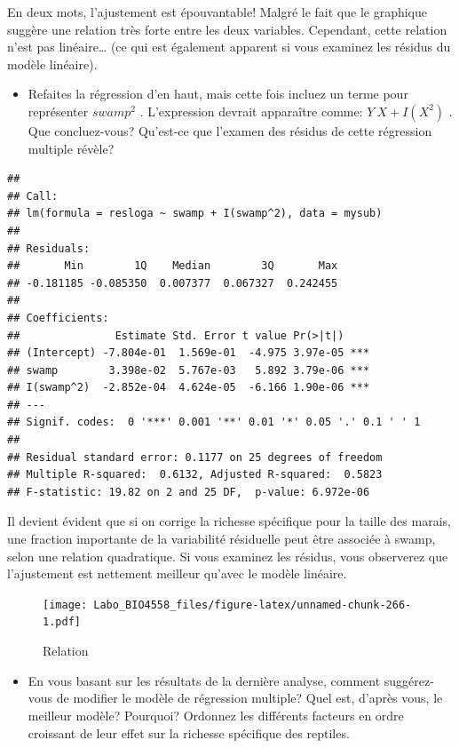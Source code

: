 \documentclass[
  12pt,
]{book}
\providecommand{\tightlist}{%
  \setlength{\itemsep}{0pt}\setlength{\parskip}{0pt}}
\begin{document}
En deux mots, l'ajustement est épouvantable! Malgré le fait que le graphique suggère une relation très forte entre les deux variables. Cependant, cette relation n'est pas linéaire\ldots{} (ce qui est également apparent si vous examinez les résidus du modèle linéaire).

\begin{itemize}
\tightlist
\item
  Refaites la régression d'en haut, mais cette fois incluez un terme pour représenter \(swamp^2\) . L'expression devrait apparaître comme: \(Y ~ X + I(X^2)\) . Que concluez-vous? Qu'est-ce que l'examen des résidus de cette régression multiple révèle?
\end{itemize}

\begin{verbatim}
## 
## Call:
## lm(formula = resloga ~ swamp + I(swamp^2), data = mysub)
## 
## Residuals:
##       Min        1Q    Median        3Q       Max 
## -0.181185 -0.085350  0.007377  0.067327  0.242455 
## 
## Coefficients:
##               Estimate Std. Error t value Pr(>|t|)    
## (Intercept) -7.804e-01  1.569e-01  -4.975 3.97e-05 ***
## swamp        3.398e-02  5.767e-03   5.892 3.79e-06 ***
## I(swamp^2)  -2.852e-04  4.624e-05  -6.166 1.90e-06 ***
## ---
## Signif. codes:  0 '***' 0.001 '**' 0.01 '*' 0.05 '.' 0.1 ' ' 1
## 
## Residual standard error: 0.1177 on 25 degrees of freedom
## Multiple R-squared:  0.6132, Adjusted R-squared:  0.5823 
## F-statistic: 19.82 on 2 and 25 DF,  p-value: 6.972e-06
\end{verbatim}

Il devient évident que si on corrige la richesse spécifique pour la taille des marais, une fraction importante de la variabilité résiduelle peut être associée à swamp, selon une relation quadratique. Si vous examinez les résidus, vous observerez que l'ajustement est nettement meilleur qu'avec le modèle linéaire.

\begin{figure}
\centering
\texttt{[image: Labo\_BIO4558\_files/figure-latex/unnamed-chunk-266-1.pdf]}
\caption{\label{fig:unnamed-chunk-266}Relation}
\end{figure}

\begin{itemize}
\tightlist
\item
  En vous basant sur les résultats de la dernière analyse, comment suggérez-vous de modifier le modèle de régression multiple? Quel est, d'après vous, le meilleur modèle? Pourquoi? Ordonnez les différents facteurs en ordre croissant de leur effet sur la richesse spécifique des reptiles.
\end{itemize}
\end{document}
